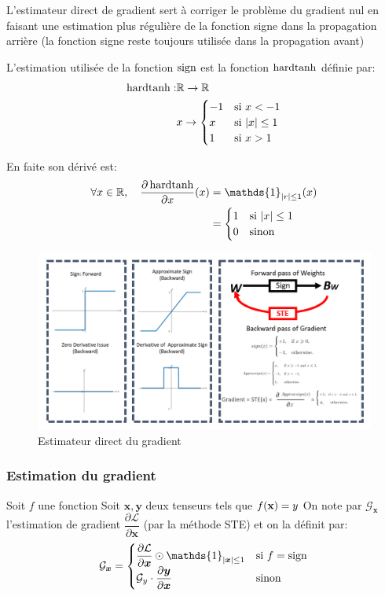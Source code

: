L'estimateur direct de gradient\cite{STEPaper} sert à corriger le problème du gradient nul en faisant une estimation plus régulière de la fonction signe dans la propagation arrière (la fonction signe reste toujours utilisée dans la propagation avant)

L'estimation utilisée de la fonction $\operatorname{sign}$ est la fonction $\operatorname{hardtanh}$ définie par:
\begin{align*}
	\operatorname{hardtanh}:& \mathbb{R}\rightarrow \mathbb{R} \\
	&x\rightarrow \begin{cases}
		-1 & \text{si } x < -1 \\
		x & \text{si } \lvert x\rvert \leq 1 \\
		1 & \text{si }  x > 1
	\end{cases}
\end{align*}

En faite son dérivé est:
\begin{align*}
	\forall x \in\mathbb{R},\quad \dfrac{\partial \hardtanh}{\partial x}(x)&=\mathds{1}_{\lvert r \rvert \leq 1}(x)\\
	&=
	\begin{cases}
		1 & \text{si } \lvert x \rvert \leq 1 \\
		0 & \text{sinon}
	\end{cases}
\end{align*}

\begin{figure}[h!]
	\centering
	\includegraphics[width=1\textwidth]{Figures/STE.png}
	\caption{Estimateur direct du gradient}
	\label{fig:STE}
\end{figure}
\FloatBarrier

\subsubsection{Estimation du gradient}
Soit $f$ une fonction
Soit $\boldsymbol{x},\boldsymbol{y}$ deux tenseurs tels que $f(\bold{x})=y$ On note par $\mathcal{G}_{\boldsymbol{x}}$ l'estimation de gradient $\dfrac{\partial \mathcal{L}}{\partial \boldsymbol{x}}$ (par la méthode STE) et on la définit par:
$$
\mathcal{G}_{\boldsymbol{x}}=\begin{cases} 
	\dfrac{\partial \mathcal{L}}{\partial \boldsymbol{x}} \odot \mathds{1}_{\lvert \boldsymbol{x} \rvert \leq 1} & \text{si } f=\sign\\
	\mathcal{G}_y \cdot \dfrac{\partial \boldsymbol{y}}{\partial \boldsymbol{x}} & \text{sinon}
\end{cases}
$$

